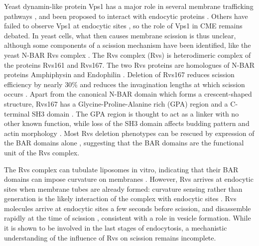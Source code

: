 \documentclass[9pt,lineno]{elife}
\begin{document}
Yeast dynamin-like protein Vps1 has a major role in several membrane trafficking pathways \citep{Rothman1990,Peters2004,Hoepfner2001}, and been proposed to interact with endocytic proteins \citep{Nannapaneni2010b, Yu2004,Smaczynska-deRooij2012}. Others have failed to observe Vps1 at endocytic sites \citep{GoudGadila2017,Kishimoto2011}, so the role of Vps1 in CME remains debated. In yeast cells, what then causes membrane scission is thus unclear, although some components of a scission mechanism have been identified, like the yeast N-BAR Rvs complex \citep{Munn1995,Kaksonen2005,DHondt2000,Kishimoto2011}. The Rvs complex  (Rvs) is heterodimeric complex of the proteins Rvs161 and Rvs167. The two Rvs proteins are homologues of N-BAR proteins Amphiphysin and Endophilin \citep{Friesen2006,Youn2010}. Deletion of Rvs167 reduces scission efficiency by nearly 30\% and reduces the invagination lengths at which scission occurs \citep{Kaksonen2005,Kukulski2012}. Apart from the canonical N-BAR domain which forms a crescent-shaped structure,  Rvs167 has a Glycine-Proline-Alanine rich (GPA) region and a C-terminal SH3 domain \citep{Sivadon1997}. The GPA region is thought to act as a linker with no other known function, while loss of the SH3 domain affects budding pattern and actin morphology \citep{Sivadon1997}. Most Rvs deletion phenotypes can be rescued by expression of the BAR domains alone \citep{Sivadon1997}, suggesting that the BAR domains are the functional unit of the Rvs complex.

The Rvs complex can tubulate liposomes in vitro, indicating that their BAR domains can impose curvature on membranes \citep{Youn2010}. However, Rvs arrives at endocytic sites when membrane tubes are already formed: curvature sensing rather than generation is the likely interaction of the complex with endocytic sites \citep{Kukulski2012,Picco2015}. Rvs molecules arrive at endocytic sites a few seconds before scission, and disassemble rapidly at the time of scission \citep{Picco2015}, consistent with a role in vesicle formation. While it is shown to be involved in the last stages of endocytosis, a mechanistic understanding of the influence of Rvs on scission remains incomplete. 
\end{document}
